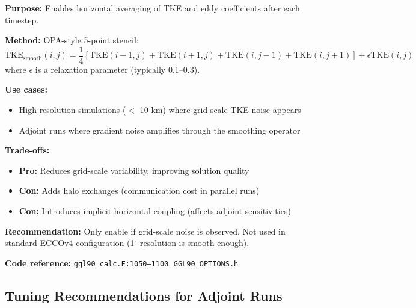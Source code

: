 \documentclass[12pt,letterpaper]{article}
\newcommand{\TKE}{\mathrm{TKE}}
\begin{document}
\textbf{Purpose:} Enables horizontal averaging of TKE and eddy coefficients after each timestep.

\textbf{Method:} OPA-style 5-point stencil:
\[
\TKE_{\mathrm{smooth}}(i,j) = \frac{1}{4}\left[\TKE(i-1,j) + \TKE(i+1,j) + \TKE(i,j-1) + \TKE(i,j+1)\right] + \epsilon \TKE(i,j)
\]
where $\epsilon$ is a relaxation parameter (typically 0.1--0.3).

\textbf{Use cases:}
\begin{itemize}[leftmargin=*]
  \item High-resolution simulations ($<$ 10 km) where grid-scale TKE noise appears
  \item Adjoint runs where gradient noise amplifies through the smoothing operator
\end{itemize}

\textbf{Trade-offs:}
\begin{itemize}[leftmargin=*]
  \item \textbf{Pro:} Reduces grid-scale variability, improving solution quality
  \item \textbf{Con:} Adds halo exchanges (communication cost in parallel runs)
  \item \textbf{Con:} Introduces implicit horizontal coupling (affects adjoint sensitivities)
\end{itemize}

\textbf{Recommendation:} Only enable if grid-scale noise is observed. Not used in standard ECCOv4 configuration (1$^\circ$ resolution is smooth enough).

\textbf{Code reference:} \texttt{ggl90\_calc.F:1050--1100}, \texttt{GGL90\_OPTIONS.h}

\subsection{Tuning Recommendations for Adjoint Runs}
\end{document}
